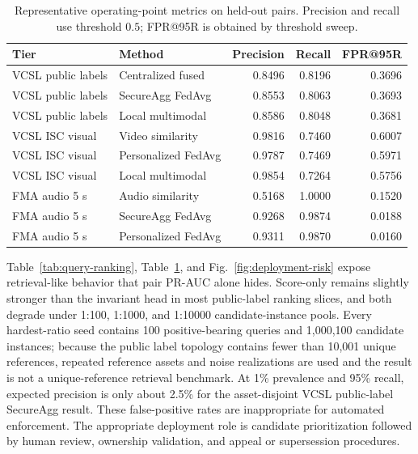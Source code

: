 \documentclass[journal]{IEEEtran}
\begin{document}
\begin{table}[!t]
\centering
\caption{Representative operating-point metrics on held-out pairs. Precision and recall use threshold $0.5$; FPR@95R is obtained by threshold sweep.}
\label{tab:operating-metrics}
\scriptsize
\begin{tabularx}{\textwidth}{p{} p{} r r r}
\toprule
Tier & Method & Precision & Recall & FPR@95R \\
\midrule
VCSL public labels & Centralized fused & 0.8496 & 0.8196 & 0.3696 \\
VCSL public labels & SecureAgg FedAvg & 0.8553 & 0.8063 & 0.3693 \\
VCSL public labels & Local multimodal & 0.8586 & 0.8048 & 0.3681 \\
VCSL ISC visual & Video similarity & 0.9816 & 0.7460 & 0.6007 \\
VCSL ISC visual & Personalized FedAvg & 0.9787 & 0.7469 & 0.5971 \\
VCSL ISC visual & Local multimodal & 0.9854 & 0.7264 & 0.5756 \\
FMA audio 5 s & Audio similarity & 0.5168 & 1.0000 & 0.1520 \\
FMA audio 5 s & SecureAgg FedAvg & 0.9268 & 0.9874 & 0.0188 \\
FMA audio 5 s & Personalized FedAvg & 0.9311 & 0.9870 & 0.0160 \\
\bottomrule
\end{tabularx}
\end{table}

Table~\ref{tab:query-ranking}, Table~\ref{tab:operating-metrics}, and Fig.~\ref{fig:deployment-risk} expose retrieval-like behavior that pair PR-AUC alone hides. Score-only remains slightly stronger than the invariant head in most public-label ranking slices, and both degrade under 1:100, 1:1000, and 1:10000 candidate-instance pools. Every hardest-ratio seed contains 100 positive-bearing queries and 1,000,100 candidate instances; because the public label topology contains fewer than 10,001 unique references, repeated reference assets and noise realizations are used and the result is not a unique-reference retrieval benchmark. At 1\% prevalence and 95\% recall, expected precision is only about 2.5\% for the asset-disjoint VCSL public-label SecureAgg result. These false-positive rates are inappropriate for automated enforcement. The appropriate deployment role is candidate prioritization followed by human review, ownership validation, and appeal or supersession procedures.
\end{document}
